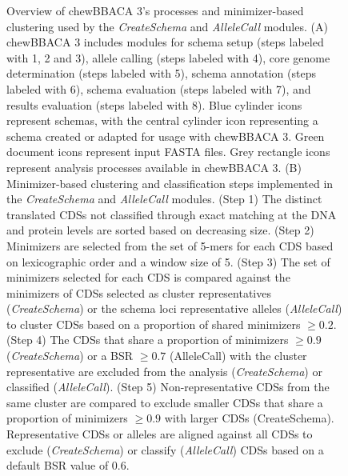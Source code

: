 \begin{figure}[h!]
    \caption{Overview of chewBBACA 3’s processes and minimizer-based clustering used by the \textit{CreateSchema} and \textit{AlleleCall} modules. (A) chewBBACA 3 includes modules for schema setup (steps labeled with 1, 2 and 3), allele calling (steps labeled with 4), core genome determination (steps labeled with 5), schema annotation (steps labeled with 6), schema evaluation (steps labeled with 7), and results evaluation (steps labeled with 8). Blue cylinder icons represent schemas, with the central cylinder icon representing a schema created or adapted for usage with chewBBACA 3. Green document icons represent input FASTA files. Grey rectangle icons represent analysis processes available in chewBBACA 3. (B) Minimizer-based clustering and classification steps implemented in the \textit{CreateSchema} and \textit{AlleleCall} modules. (Step 1) The distinct translated CDSs not classified through exact matching at the DNA and protein levels are sorted based on decreasing size. (Step 2) Minimizers are selected from the set of 5-mers for each CDS based on lexicographic order and a window size of 5. (Step 3) The set of minimizers selected for each CDS is compared against the minimizers of CDSs selected as cluster representatives (\textit{CreateSchema}) or the schema loci representative alleles (\textit{AlleleCall}) to cluster CDSs based on a proportion of shared minimizers $\geq0.2$. (Step 4) The CDSs that share a proportion of minimizers $\geq0.9$ (\textit{CreateSchema}) or a BSR $\geq0.7$ (AlleleCall) with the cluster representative are excluded from the analysis (\textit{CreateSchema}) or classified (\textit{AlleleCall}). (Step 5) Non-representative CDSs from the same cluster are compared to exclude smaller CDSs that share a proportion of minimizers $\geq0.9$ with larger CDSs (CreateSchema). Representative CDSs or alleles are aligned against all CDSs to exclude (\textit{CreateSchema}) or classify (\textit{AlleleCall}) CDSs based on a default BSR value of 0.6.}
\end{figure}


% 




